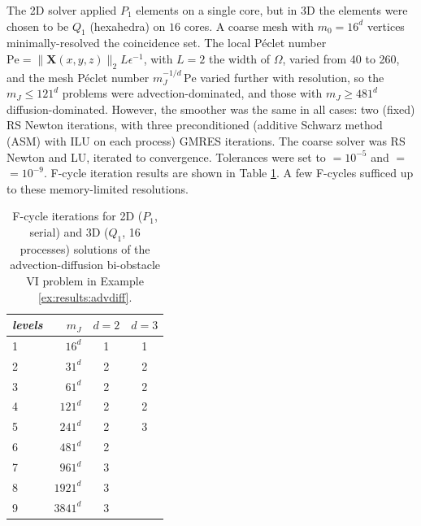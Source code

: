 \documentclass[review,hidelinks,onefignum,onetabnum]{siamart220329}
\newcommand{\eps}{\epsilon}
\newcommand{\bX}{\mathbf{X}}
\begin{document}
\begin{example}
The 2D solver applied $P_1$ elements on a single core, but in 3D the elements were chosen to be $Q_1$ (hexahedra) on $16$ cores.  A coarse mesh with $m_0=16^d$ vertices minimally-resolved the coincidence set.  The local Péclet number $\text{Pe}=\|\bX(x,y,z)\|_2 L \eps^{-1}$, with $L=2$ the width of $\Omega$, varied from 40 to 260, and the mesh Péclet number $m_J^{-1/d}\,\text{Pe}$ varied further with resolution, so the $m_J\le 121^d$ problems were advection-dominated, and those with $m_J\ge 481^d$ diffusion-dominated.  However, the smoother was the same in all cases: two (fixed) RS Newton iterations, with three preconditioned (additive Schwarz method (ASM) with ILU on each process) GMRES iterations.  The coarse solver was RS Newton and LU, iterated to convergence.  Tolerances were set to  $=10^{-5}$ and  $=$  $= 10^{-9}$.  F-cycle iteration results are shown in Table \ref{tab:results:advdiff}.  A few F-cycles sufficed up to these memory-limited resolutions.
\end{example}

\begin{table}[ht]
\centering
\begin{tabular}{lr@{\hskip 7mm}c@{\hskip 4mm}c}
\toprule
\emph{levels} & $m_J$ & $d=2$ & $d=3$ \\
\midrule
 1 &    $16^d$ & 1 & 1 \\
 2 &    $31^d$ & 2 & 2 \\
 3 &    $61^d$ & 2 & 2 \\
 4 &   $121^d$ & 2 & 2 \\
 5 &   $241^d$ & 2 & 3 \\
 6 &   $481^d$ & 2 \\
 7 &   $961^d$ & 3 \\
 8 &  $1921^d$ & 3 \\
 9 &  $3841^d$ & 3 \\
\bottomrule
\end{tabular}
\bigskip
\caption{F-cycle iterations for 2D ($P_1$, serial) and 3D ($Q_1$, 16 processes) solutions of the advection-diffusion bi-obstacle VI problem in Example \ref{ex:results:advdiff}.}
\label{tab:results:advdiff}
\end{table}
\end{document}

